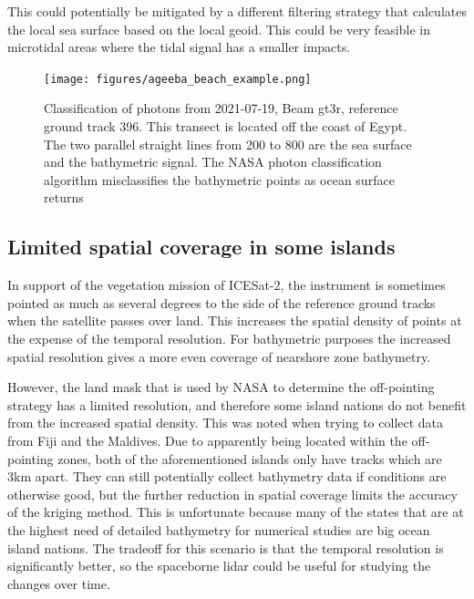 This could potentially be mitigated by a different filtering strategy that calculates the local sea surface based on the local geoid. This could be very feasible in microtidal areas where the tidal signal has a smaller impacts.

\begin{figure}[htbp]
    \centering
    \texttt{[image: figures/ageeba\_beach\_example.png]}
    \caption[Misclassification errors example]{Classification of photons from 2021-07-19, Beam gt3r, reference ground track 396. This transect is located off the coast of Egypt. The two parallel straight lines from 200 to 800 are the sea surface and the bathymetric signal. The NASA photon classification algorithm misclassifies the bathymetric points as ocean surface returns}
    \label{fig:ageeba_bad_classes}
\end{figure}


\subsection{Limited spatial coverage in some islands}

In support of the vegetation mission of ICESat-2, the instrument is sometimes pointed as much as several degrees to the side of the reference ground tracks when the satellite passes over land. This increases the spatial density of points at the expense of the temporal resolution. For bathymetric purposes the increased spatial resolution gives a more even coverage of nearshore zone bathymetry. 

However, the land mask that is used by NASA to determine the off-pointing strategy has a limited resolution, and therefore some island nations do not benefit from the increased spatial density. This was noted when trying to collect data from Fiji and the Maldives. Due to apparently being located within the off-pointing zones, both of the aforementioned islands only have tracks which are 3km apart. They can still potentially collect bathymetry data if conditions are otherwise good, but the further reduction in spatial coverage limits the accuracy of the kriging method. This is unfortunate because many of the states that are at the highest need of detailed bathymetry for numerical studies are big ocean island nations. The tradeoff for this scenario is that the temporal resolution is significantly better, so the spaceborne lidar could be useful for studying the changes over time. 

